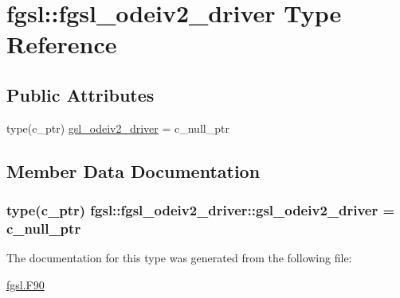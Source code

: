 \hypertarget{structfgsl_1_1fgsl__odeiv2__driver}{\section{fgsl\-:\-:fgsl\-\_\-odeiv2\-\_\-driver Type Reference}
\label{structfgsl_1_1fgsl__odeiv2__driver}
}
\subsection*{Public Attributes}
\begin{DoxyCompactItemize}
\item 
type(c\-\_\-ptr) \hyperlink{structfgsl_1_1fgsl__odeiv2__driver_a76935e00c460e2c2a4235f6c7d653f1b}{gsl\-\_\-odeiv2\-\_\-driver} = c\-\_\-null\-\_\-ptr
\end{DoxyCompactItemize}


\subsection{Member Data Documentation}
\hypertarget{structfgsl_1_1fgsl__odeiv2__driver_a76935e00c460e2c2a4235f6c7d653f1b}{
\subsubsection[{gsl\-\_\-odeiv2\-\_\-driver}]{\setlength{\rightskip}{0pt plus 5cm}type(c\-\_\-ptr) fgsl\-::fgsl\-\_\-odeiv2\-\_\-driver\-::gsl\-\_\-odeiv2\-\_\-driver = c\-\_\-null\-\_\-ptr}}\label{structfgsl_1_1fgsl__odeiv2__driver_a76935e00c460e2c2a4235f6c7d653f1b}


The documentation for this type was generated from the following file\-:\begin{DoxyCompactItemize}
\item 
\hyperlink{fgsl_8F90}{fgsl.\-F90}\end{DoxyCompactItemize}

